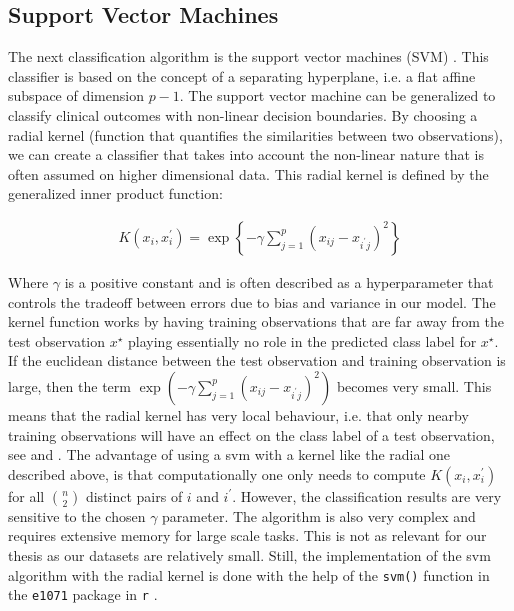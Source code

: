 \documentclass[../thesis.tex]{subfiles}
\begin{document}
\subsection{Support Vector Machines}
\label{subsec:svm}

\noindent The next classification algorithm is the support vector machines (SVM) \citep{vapnik1963pattern}. This classifier is based on the concept of a separating hyperplane, i.e. a flat affine subspace of dimension $p-1$. The support vector machine can be generalized to classify clinical outcomes with non-linear decision boundaries. By choosing a radial kernel (function that quantifies the similarities between two observations), we can create a classifier that takes into account the non-linear nature that is often assumed on higher dimensional data. This radial kernel is defined by the generalized inner product function: 
\newpage

\begin{align}
    K(x_i, x_i^\prime) = \exp{\left\{-\gamma \sum_{j=1}^p\left(x_{ij} - x_{i^\prime j} \right)^2\right\}}
\end{align}

\noindent Where $\gamma$ is a positive constant and is often described as a hyperparameter that controls the tradeoff between errors due to bias and variance in our model. The kernel function works by having training observations that are far away from the test observation $x^\star$ playing essentially no role in the predicted class label for $x^\star$. If the euclidean distance between the test observation and training observation is large, then the term $\exp{(-\gamma \sum_{j=1}^p\left(x_{ij} - x_{i^\prime j} \right)^2)}$ becomes very small. This means that the radial kernel has very local behaviour, i.e. that only nearby training observations will have an effect on the class label of a test observation, see \citep{friedman2009elements} and \citep{james2013introduction}. The advantage of using a svm with a kernel like the radial one described above, is that computationally one only needs to compute $K(x_i, x_i^\prime)$ for all $\binom{n}{2}$ distinct pairs of $i$ and $i^\prime$. However, the classification results are very sensitive to the chosen $\gamma$ parameter. The algorithm is also very complex and requires extensive memory for large scale tasks. This is not as relevant for our thesis as our datasets are relatively small. Still, the implementation of the svm algorithm with the radial kernel is done with the help of the \texttt{svm()} function in the \texttt{e1071} package in \texttt{r} \citep{svm}.
\end{document}
